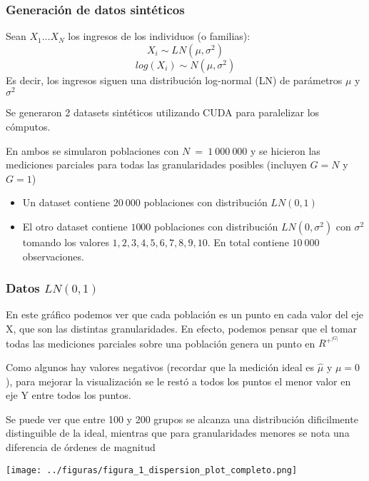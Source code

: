 \documentclass[10pt,mathserif]{beamer}%
\begin{document}
\begin{frame}
    \frametitle{ Generación de datos sintéticos }
    \begin{lemma}
        Sean $X_1 \dots X_N$ los ingresos de los individuos (o familias):
        $$X_i \sim LN(\mu,\sigma^2)$$ 
        $$ log(X_i) \sim N(\mu, \sigma^2)$$
        Es decir, los ingresos siguen una distribución log-normal (LN) de parámetros $\mu$ y $\sigma^2$
    \end{lemma}
    
    Se generaron 2 datasets sintéticos utilizando CUDA para paralelizar los cómputos.

    En ambos se simularon poblaciones con $N\ =\ 1\ 000\ 000$ y se hicieron las mediciones parciales para todas las granularidades posibles (incluyen $G=N$ y $G=1$)

    \begin{itemize}
        \item Un dataset contiene $20\ 000$ poblaciones con distribución $LN(0,1)$
        \item El otro dataset contiene $1 000$ poblaciones con distribución $LN(0, \sigma^2)$ con $\sigma^2$ tomando los valores $1, 2, 3, 4, 5, 6, 7, 8, 9, 10$. En total contiene $10\ 000$ observaciones. 
    \end{itemize}

\end{frame}

\begin{frame}
    \frametitle{Datos $LN(0,1)$}
    \begin{multicols}{2}
        \begin{minipage}{\linewidth}
            En este gráfico podemos ver que cada población es un punto en cada valor del eje X, que son las distintas granularidades. En efecto, podemos pensar que el tomar todas las mediciones parciales sobre una población genera un punto en $R^+^{|G|}$

            Como algunos hay valores negativos (recordar que la medición ideal es $\hat{\mu}$ y $\mu=0$), para mejorar la visualización se le restó a todos los puntos el menor valor en eje Y entre todos los puntos.

            Se puede ver que entre 100 y 200 grupos se alcanza una distribución dificilmente distinguible de la ideal, mientras que para granularidades menores se nota una diferencia de órdenes de magnitud

        \end{minipage}

        \begin{minipage}{\linewidth}
            \centering
            \texttt{[image: ../figuras/figura\_1\_dispersion\_plot\_completo.png]} %
        \end{minipage}

    \end{multicols}
\end{frame}
\end{document}
